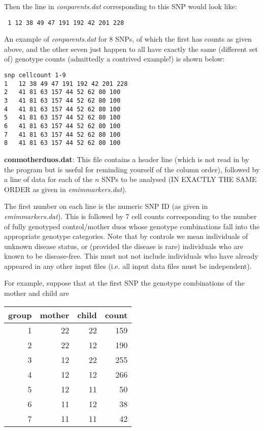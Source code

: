 \documentclass[a4paper,11pt]{report}
\begin{document}
Then the line in	{\it  conparents.dat} corresponding to this SNP 
would look like:

{\tt
1 	12 38 49 47 191 192 42 201 228
}

An example of {\it  conparents.dat} for 8 SNPs, of which the first has counts as given above, and the other seven just happen to all have exactly the same (different set of) genotype counts (admittedly a contrived example!) is shown below:

\begin{verbatim}
snp	cellcount 1-9
1 	12 38 49 47 191 192 42 201 228
2 	41 81 63 157 44 52 62 80 100
3 	41 81 63 157 44 52 62 80 100
4 	41 81 63 157 44 52 62 80 100
5 	41 81 63 157 44 52 62 80 100
6 	41 81 63 157 44 52 62 80 100
7 	41 81 63 157 44 52 62 80 100
8 	41 81 63 157 44 52 62 80 100
\end{verbatim}
 \bigskip

	{\bf  conmotherduos.dat}:  This file contains a header line
(which is not read in by the program but is useful for reminding
yourself of the  column order), followed by a line of data
for each of the $n$ SNPs to be analysed (IN EXACTLY THE SAME ORDER
as given in {\it emimmarkers.dat}).

The first number on each line is the numeric SNP ID (as given in {\it emimmarkers.dat}). This is followed by 7 cell counts corresponding to the number
of fully genotyped control/mother duos whose genotype combinations
fall into the appropriate genotype categories. 
Note that by controls we mean individuals of unknown disease status, or
(provided the disease is rare) individuals who are known to
be disease-free.  This must not not include individuals
who have already appeared in any other input files 
(i.e. all input data files must be
independent).



For example, suppose that at the first SNP the genotype combinations of the mother and child are

\begin{tabular}{rrrr} 
group    &   mother &child   &count \\ \hline
1 &22 &22       &159\\
2 &22 &12       &190\\
3 &12 &22       &255\\
4 &12 &12       &266\\
5 &12 &11 &50\\
6 &11 &12 &38\\
7 &11 &11 &42\\
\end{tabular}
\end{document}
